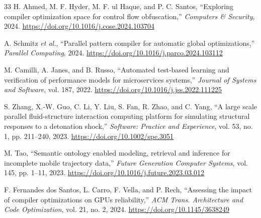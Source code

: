 \documentclass[conference,a4paper]{IEEEtran}
\begin{document}
\begin{thebibliography}{33}
H. Ahmed, M. F. Hyder, M. F. ul Haque, and P. C. Santos,
``Exploring compiler optimization space for control flow obfuscation,''
\textit{Computers \& Security}, 2024.
\url{https://doi.org/10.1016/j.cose.2024.103704}

A. Schmitz \textit{et al.},
``Parallel pattern compiler for automatic global optimizations,''
\textit{Parallel Computing}, 2024.
\url{https://doi.org/10.1016/j.parco.2024.103112}

M. Camilli, A. Janes, and B. Russo,
``Automated test-based learning and verification of performance models for microservices systems,''
\textit{Journal of Systems and Software}, vol. 187, 2022.
\url{https://doi.org/10.1016/j.jss.2022.111225}

S. Zhang, X.-W. Guo, C. Li, Y. Liu, S. Fan, R. Zhao, and C. Yang,
``A large scale parallel fluid-structure interaction computing platform for simulating structural responses to a detonation shock,''
\textit{Software: Practice and Experience}, vol. 53, no. 1, pp. 211--240, 2023.
\url{https://doi.org/10.1002/spe.3051}

M. Tao,
``Semantic ontology enabled modeling, retrieval and inference for incomplete mobile trajectory data,''
\textit{Future Generation Computer Systems}, vol. 145, pp. 1--11, 2023.
\url{https://doi.org/10.1016/j.future.2023.03.012}

F. Fernandes dos Santos, L. Carro, F. Vella, and P. Rech,
``Assessing the impact of compiler optimizations on GPUs reliability,''
\textit{ACM Trans. Architecture and Code Optimization}, vol. 21, no. 2, 2024.
\url{https://doi.org/10.1145/3638249}

\end{thebibliography}
\end{document}
